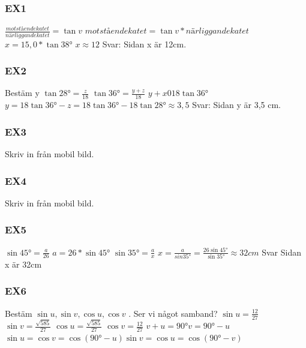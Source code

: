 \documentclass[a4paper,10pt]{article}
\begin{document}
\begin{flushleft}
    \subsubsection{EX1}
      $ \frac{motstående katet}{närliggande katet} = \tan v $\newline
      $ motstående katet = \tan v * närliggande katet $\newline
      $ x = 15,0*\tan 38° $\newline
      $ x \approx 12 $\newline\newline
      Svar: Sidan x är 12cm.
    \subsubsection{EX2}
      Bestäm y\newline
      $ \tan 28° = \frac{z}{18} $\newline
      $ \tan 36° = \frac{y+z}{18} $\newline
      $ y+x 0 18 \tan 36° $\newline
      $ y = 18 \tan 36°-z = 18 \tan 36° - 18 \tan 28° \approx 3,5 $\newline\newline
      Svar: Sidan y är 3,5 cm.
    \subsubsection{EX3}

      Skriv in från mobil bild.
    \subsubsection{EX4}
      Skriv in från mobil bild.
    \subsubsection{EX5}
      $ \sin 45° = \frac{a}{26} $\newline
      $ a = 26*\sin 45° $\newline
      $ \sin 35° = \frac{a}{x} $\newline
      $ x = \frac{a}{sin35°} = \frac{26\sin 45°}{\sin 35°} \approx 32cm $\newline
      Svar Sidan x är 32cm
    \subsubsection{EX6}
      Bestäm $ \sin u, \sin v, \cos u, \cos v $ . Ser vi något samband?\newline
      $ \sin u = \frac{12}{27} $\newline
      $ \sin v = \frac{\sqrt{585}}{27} $\newline
      $ \cos u = \frac{\sqrt{585}}{27} $\newline
      $ \cos v = \frac{12}{27} $\newline
      $ v+u = 90°$\newline$ v = 90°-u $\newline$ \sin u = \cos v = \cos(90°-u)$\newline$ \sin v = \cos u = \cos(90°-v) $

\end{flushleft}
\end{document}
